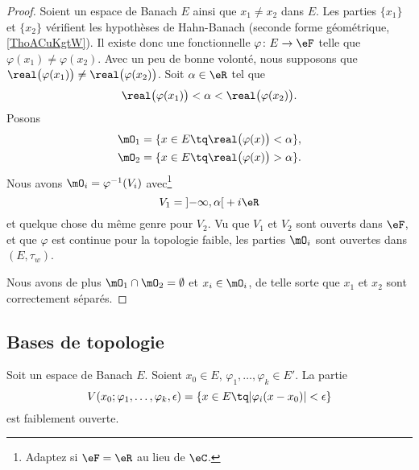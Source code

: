 \begin{proof}
	Soient un espace de Banach \( E\) ainsi que \( x_1\neq x_2\) dans \( E\). Les parties \( \{ x_1 \}\) et \( \{ x_2 \}\) vérifient les hypothèses de Hahn-Banach (seconde forme géométrique, \ref{ThoACuKgtW}). Il existe donc une fonctionnelle \( \varphi\colon E\to \eF\) telle que \( \varphi(x_1)\neq \varphi(x_2)\). Avec un peu de bonne volonté, nous supposons que \( \real\big( \varphi(x_1) \big)\neq \real\big( \varphi(x_2) \big)\). Soit \( \alpha\in \eR\) tel que
	\begin{equation}
		\real\big( \varphi(x_1) \big)<\alpha <\real\big( \varphi(x_2) \big).
	\end{equation}
	Posons
	\begin{subequations}
		\begin{align}
			\mO_1 & =\{ x\in E\tq\real\big( \varphi(x) \big)< \alpha \}, \\
			\mO_2 & =\{ x\in E\tq\real\big( \varphi(x) \big)> \alpha \}.
		\end{align}
	\end{subequations}
	Nous avons \( \mO_i=\varphi^{-1}(V_i)\) avec\footnote{Adaptez si \( \eF=\eR\) au lieu de \( \eC\).}
	\begin{equation}
		V_1= \mathopen] -\infty , \alpha \mathclose[+i\eR
	\end{equation}
	et quelque chose du même genre pour \( V_2\). Vu que \( V_1\) et \( V_2\) sont ouverts dans \( \eF\), et que \( \varphi\) est continue pour la topologie faible, les parties \( \mO_i\) sont ouvertes dans \( (E,\tau_w)\).

	Nous avons de plus \( \mO_1\cap\mO_2=\emptyset\) et \( x_i\in \mO_i\), de telle sorte que \( x_1\) et \( x_2\) sont correctement séparés.
\end{proof}

\subsection{Bases de topologie}


\begin{lemma}			\label{LEMooEFVXooIWBBdW}
	Soit un espace de Banach \( E\). Soient \( x_0\in E\), \( \varphi_1,\ldots, \varphi_k\in E'\). La partie
	\begin{equation}
		V(x_0;\varphi_1,\ldots, \varphi_k,\epsilon)=\{ x\in E\tq | \varphi_i(x-x_0) |<\epsilon \}
	\end{equation}
	est faiblement ouverte.
\end{lemma}

